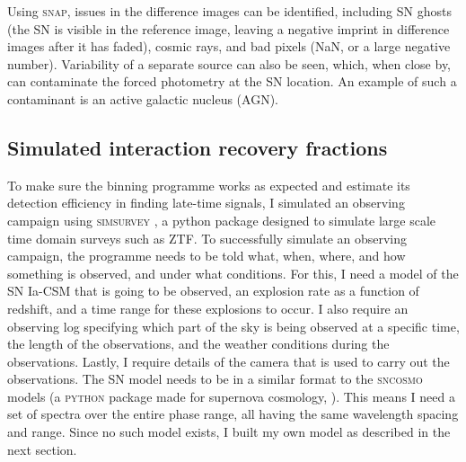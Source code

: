 \documentclass[a4paper,oneside,12pt, class=Latex/Classes/PhDthesisPSnPDF, crop=false]{standalone}
\begin{document}
Using \textsc{snap}, issues in the difference images can be identified, including SN ghosts (the SN is visible in the reference image, leaving a negative imprint in difference images after it has faded), cosmic rays, and bad pixels (NaN, or a large negative number). Variability of a separate source can also be seen, which, when close by, can contaminate the forced photometry at the SN location. An example of such a contaminant is an active galactic nucleus (AGN).


\subsection{Simulated interaction recovery fractions}
\label{simulation}
To make sure the binning programme works as expected and estimate its detection efficiency in finding late-time signals, I simulated an observing campaign using \textsc{simsurvey} \citep{simsurvey, simsurvey_main}, a python package designed to simulate large scale time domain surveys such as ZTF. To successfully simulate an observing campaign, the programme needs to be told what, when, where, and how something is observed, and under what conditions. For this, I need a model of the SN Ia-CSM that is going to be observed, an explosion rate as a function of redshift, and a time range for these explosions to occur. I also require an observing log specifying which part of the sky is being observed at a specific time, the length of the observations, and the weather conditions during the observations. Lastly, I require details of the camera that is used to carry out the observations. The SN model needs to be in a similar format to the \textsc{sncosmo} models (a \textsc{python} package made for supernova cosmology, \citealt{sncosmo}). This means I need a set of spectra over the entire phase range, all having the same wavelength spacing and range. Since no such model exists, I built my own model as described in the next section.
\end{document}
